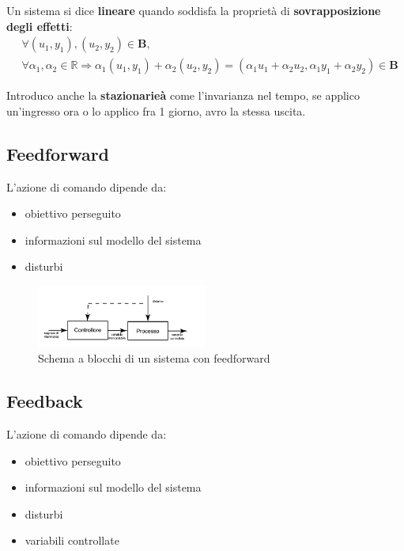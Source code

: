 Un sistema si dice \textbf{lineare} quando soddisfa la proprietà di \textbf{sovrapposizione degli effetti}:
\begin{align}
	 & \forall (u_1, y_1), (u_2, y_2) \in \mathbf{B},                                                                                                                            \\
	 & \forall \alpha_1, \alpha_2 \in \mathbb{R} \Rightarrow \alpha_1(u_1, y_1) + \alpha_2(u_2, y_2) = (\alpha_1 u_1 + \alpha_2 u_2, \alpha_1 y_1 + \alpha_2 y_2) \in \mathbf{B}
\end{align}

Introduco anche la \textbf{stazionarieà} come l'invarianza nel tempo, se applico un'ingresso ora o lo applico fra 1 giorno, avro la stessa uscita.

\subsection{Feedforward}
L'azione di comando dipende da:
\begin{itemize}
	\item obiettivo perseguito
	\item informazioni sul modello del sistema
	\item disturbi
\end{itemize}

\begin{figure}[!ht]
	\centering
	\includegraphics[width=0.5\textwidth]{./images/feedforward.png}
	\caption{Schema a blocchi di un sistema con feedforward}
	\label{fig:feedforward}
\end{figure}

\subsection{Feedback}

L'azione di comando dipende da:
\begin{itemize}
	\item obiettivo perseguito
	\item informazioni sul modello del sistema
	\item disturbi
	\item variabili controllate
\end{itemize}

